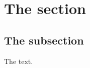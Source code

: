 \documentclass{article}
\begin{document}
\section{The section}

\subsection{The subsection}

The text.
\end{document}
